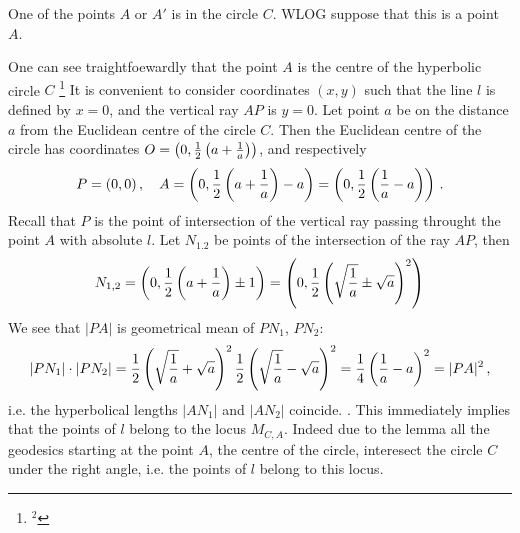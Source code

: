 One of the points $A$ or $A'$ is in the circle $C$. 
WLOG suppose that this is a point $A$. 

 One can see traightfoewardly that the point $A$ is the centre
of the hyperbolic circle  $C$
\footnote{$^2$}
           {
   It is convenient to consider coordinates
$(x,y)$ such that the line $l$ is defined by $x=0$, and the vertical
ray $AP$ is $y=0$.
  Let point $a$ be on the distance $a$ from the Euclidean centre
of the circle $C$. Then the Euclidean centre of the circle has coordinates 
$O=\left(0,{1\over 2}\left(a+{1\over a}\right)\right)$,
and respectively 
                      $$
P=(0,0)\,,\quad
 A=\left(0,{1\over 2}\left(a+{1\over a}\right)-a\right)=
        \left(0,{1\over 2}\left({1\over a}-a\right)\right)\,.
                      $$
Recall that $P$ is the point of intersection of the vertical 
ray passing throught the point $A$
with absolute $l$.
Let  $N_{1.2}$ be points of the intersection of
the ray $AP$, then
                 $$
N_{1,2}=\left(0,{1\over 2}\left(a+{1\over a}\right)\pm 1\right)=
       \left(0, {1\over 2}\left(\sqrt {1\over a}\pm \sqrt {a}\right)^2\right)
                 $$
We see that  $|PA|$ is geometrical mean of $PN_1$, $PN_2$:
                             $$
|PN_1|\cdot |PN_2|={1\over 2}
      \left(\sqrt {1\over a}+\sqrt {a}\right)^2
   {1\over 2}\left(\sqrt {1\over a}- \sqrt {a}\right)^2=
   {1\over 4}\left({1\over a}-  {a}\right)^2=
   |PA|^2\,,
                             $$ 
i.e. the hyperbolical lengths $|AN_1|$ and $|AN_2|$ coincide.
}.
This immediately implies that the points of $l$ belong to the locus
   $M_{C,A}$.  Indeed  due to the lemma all the geodesics starting
at the point $A$, the centre of the circle, interesect 
the circle $C$ under the right angle, i.e. the points of $l$
belong to this locus.
 
\bye

